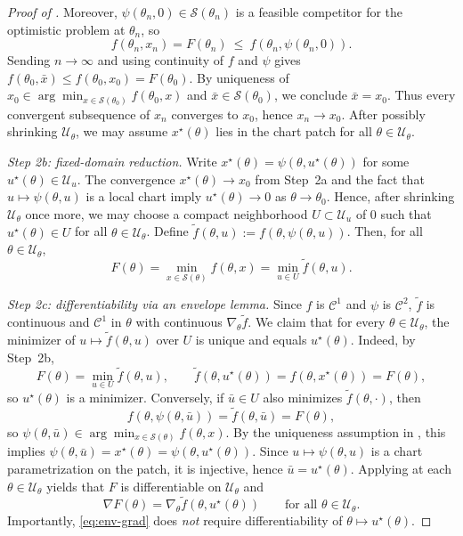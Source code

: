 \documentclass{article}
\theoremstyle{normaltheorem}
\newcommand{\calS}{\mathcal{S}}
\begin{document}
\begin{proof}[Proof of ]
			Moreover, $\psi(\theta_n,0)\in\calS(\theta_n)$ is a feasible competitor for the optimistic problem at $\theta_n$, so
			\[
			f(\theta_n,x_n)=F(\theta_n)\ \le\ f(\theta_n,\psi(\theta_n,0)).
			\]
			Sending $n\to\infty$ and using continuity of $f$ and $\psi$ gives $f(\theta_0,\bar x)\le f(\theta_0,x_0)=F(\theta_0)$.
			By uniqueness of $x_0\in\arg\min_{x\in\calS(\theta_0)} f(\theta_0,x)$ and $\bar x\in\calS(\theta_0)$, we conclude $\bar x=x_0$.
			Thus every convergent subsequence of $x_n$ converges to $x_0$, hence $x_n\to x_0$.
			After possibly shrinking $\mathcal U_\theta$, we may assume $x^\star(\theta)$ lies in the chart patch for all $\theta\in\mathcal U_\theta$.
			
				\emph{Step 2b: fixed-domain reduction.}
				Write $x^\star(\theta)=\psi(\theta,u^\star(\theta))$ for some $u^\star(\theta)\in\mathcal U_u$.
				The convergence \(x^\star(\theta)\to x_0\) from Step~2a and the fact that \(u\mapsto\psi(\theta,u)\) is a local
				chart imply \(u^\star(\theta)\to0\) as \(\theta\to\theta_0\). Hence, after shrinking
				\(\mathcal U_\theta\) once more, we may choose a compact neighborhood \(U\subset\mathcal U_u\) of \(0\) such that
				\(u^\star(\theta)\in U\) for all \(\theta\in\mathcal U_\theta\).
				Define $\tilde f(\theta,u):=f(\theta,\psi(\theta,u))$.
				Then, for all $\theta\in\mathcal U_\theta$,
				\[
			F(\theta)=\min_{x\in\calS(\theta)} f(\theta,x)=\min_{u\in U}\tilde f(\theta,u).
			\]
			
			\emph{Step 2c: differentiability via an envelope lemma.}
			Since $f$ is $\mathcal{C}^{1}$ and $\psi$ is $\mathcal{C}^{2}$, $\tilde f$ is continuous and $\mathcal{C}^{1}$ in $\theta$ with continuous $\nabla_\theta\tilde f$.
			We claim that for every $\theta\in\mathcal U_\theta$, the minimizer of $u\mapsto \tilde f(\theta,u)$ over $U$ is unique and equals $u^\star(\theta)$.
			Indeed, by Step~2b,
			\[
			F(\theta)=\min_{u\in U}\tilde f(\theta,u),
			\qquad
			\tilde f(\theta,u^\star(\theta))=f(\theta,x^\star(\theta))=F(\theta),
			\]
			so $u^\star(\theta)$ is a minimizer.
			Conversely, if $\bar u\in U$ also minimizes $\tilde f(\theta,\cdot)$, then
			\[
			f(\theta,\psi(\theta,\bar u))=\tilde f(\theta,\bar u)=F(\theta),
			\]
			so $\psi(\theta,\bar u)\in\arg\min_{x\in\calS(\theta)} f(\theta,x)$.
			By the uniqueness assumption in , this implies
			$\psi(\theta,\bar u)=x^\star(\theta)=\psi(\theta,u^\star(\theta))$.
			Since $u\mapsto \psi(\theta,u)$ is a chart parametrization on the patch, it is injective, hence $\bar u=u^\star(\theta)$.
			Applying  at each $\theta\in\mathcal U_\theta$ yields that $F$ is differentiable on $\mathcal U_\theta$ and
			\begin{equation}\label{eq:env-grad}
			\nabla F(\theta)=\nabla_\theta \tilde f(\theta,u^\star(\theta))
			\qquad\text{for all }\theta\in\mathcal U_\theta.
			\end{equation}
			Importantly, \eqref{eq:env-grad} does \emph{not} require differentiability of $\theta\mapsto u^\star(\theta)$.
			

\end{proof}
\end{document}
